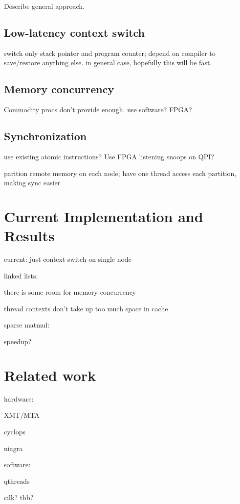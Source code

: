 \documentclass{acm_proc_article-sp}
\begin{document}
Describe general approach.

\subsection{Low-latency context switch}

switch only stack pointer and program counter; depend on compiler to save/restore anything else. in general case, hopefully this will be fast.

\subsection{Memory concurrency}

Commodity procs don't provide enough. use software? FPGA?

\subsection{Synchronization}

use existing atomic instructions? Use FPGA listening snoops on QPI?


parition remote memory on each node; have one thread access each
partition, making sync easier

\section{Current Implementation and Results}

current: just context switch on single node


linked lists:

there is some room for memory concurrency

thread contexts don't take up too much space in cache

sparse matmul:

speedup?






\section{Related work}


hardware:

XMT/MTA

cyclops

niagra

software:

qthreads

cilk? tbb?
\end{document}
